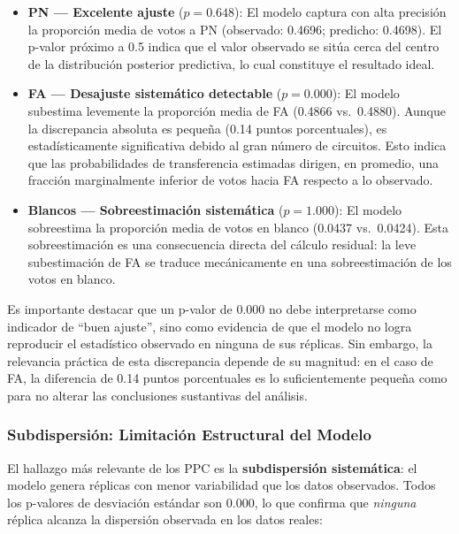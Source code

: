 \begin{itemize}
    \item \textbf{PN --- Excelente ajuste} ($p = 0.648$): El modelo captura con alta precisi\'on la proporci\'on media de votos a PN (observado: 0.4696; predicho: 0.4698). El p-valor pr\'oximo a 0.5 indica que el valor observado se sit\'ua cerca del centro de la distribuci\'on posterior predictiva, lo cual constituye el resultado ideal.

    \item \textbf{FA --- Desajuste sistem\'atico detectable} ($p = 0.000$): El modelo subestima levemente la proporci\'on media de FA (0.4866 vs.\ 0.4880). Aunque la discrepancia absoluta es peque\~na (0.14 puntos porcentuales), es estad\'isticamente significativa debido al gran n\'umero de circuitos. Esto indica que las probabilidades de transferencia estimadas dirigen, en promedio, una fracci\'on marginalmente inferior de votos hacia FA respecto a lo observado.

    \item \textbf{Blancos --- Sobreestimaci\'on sistem\'atica} ($p = 1.000$): El modelo sobreestima la proporci\'on media de votos en blanco (0.0437 vs.\ 0.0424). Esta sobreestimaci\'on es una consecuencia directa del c\'alculo residual: la leve subestimaci\'on de FA se traduce mec\'anicamente en una sobreestimaci\'on de los votos en blanco.
\end{itemize}

Es importante destacar que un p-valor de 0.000 no debe interpretarse como indicador de ``buen ajuste'', sino como evidencia de que el modelo no logra reproducir el estad\'istico observado en ninguna de sus r\'eplicas. Sin embargo, la relevancia pr\'actica de esta discrepancia depende de su magnitud: en el caso de FA, la diferencia de 0.14 puntos porcentuales es lo suficientemente peque\~na como para no alterar las conclusiones sustantivas del an\'alisis.

\subsubsection{Subdispersi\'on: Limitaci\'on Estructural del Modelo}

El hallazgo m\'as relevante de los PPC es la \textbf{subdispersi\'on sistem\'atica}: el modelo genera r\'eplicas con menor variabilidad que los datos observados. Todos los p-valores de desviaci\'on est\'andar son 0.000, lo que confirma que \emph{ninguna} r\'eplica alcanza la dispersi\'on observada en los datos reales:

